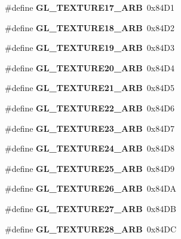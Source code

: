 \begin{DoxyCompactItemize}
\item 
\#define {\bfseries G\+L\+\_\+\+T\+E\+X\+T\+U\+R\+E17\+\_\+\+A\+R\+B}~0x84\+D1\label{_s_d_l__opengl_8h_a7ff96afdff3dd5d0020643dcfedddd0f}

\item 
\#define {\bfseries G\+L\+\_\+\+T\+E\+X\+T\+U\+R\+E18\+\_\+\+A\+R\+B}~0x84\+D2\label{_s_d_l__opengl_8h_a3009d9288b5ff6a7218a04efb42f94f0}

\item 
\#define {\bfseries G\+L\+\_\+\+T\+E\+X\+T\+U\+R\+E19\+\_\+\+A\+R\+B}~0x84\+D3\label{_s_d_l__opengl_8h_a6b2f54a8037012a8dc8e10146b29ba4c}

\item 
\#define {\bfseries G\+L\+\_\+\+T\+E\+X\+T\+U\+R\+E20\+\_\+\+A\+R\+B}~0x84\+D4\label{_s_d_l__opengl_8h_aa050e993492ce097cf0273be4838014f}

\item 
\#define {\bfseries G\+L\+\_\+\+T\+E\+X\+T\+U\+R\+E21\+\_\+\+A\+R\+B}~0x84\+D5\label{_s_d_l__opengl_8h_a8cd9b3a28066afd7694b4fc4c9629f80}

\item 
\#define {\bfseries G\+L\+\_\+\+T\+E\+X\+T\+U\+R\+E22\+\_\+\+A\+R\+B}~0x84\+D6\label{_s_d_l__opengl_8h_a57e5fe52a954449546b89da9f45fd415}

\item 
\#define {\bfseries G\+L\+\_\+\+T\+E\+X\+T\+U\+R\+E23\+\_\+\+A\+R\+B}~0x84\+D7\label{_s_d_l__opengl_8h_a2939ad95f95329f1864350f7f6f671ae}

\item 
\#define {\bfseries G\+L\+\_\+\+T\+E\+X\+T\+U\+R\+E24\+\_\+\+A\+R\+B}~0x84\+D8\label{_s_d_l__opengl_8h_a35a9bfe5b9159b6acf132c2443037b8e}

\item 
\#define {\bfseries G\+L\+\_\+\+T\+E\+X\+T\+U\+R\+E25\+\_\+\+A\+R\+B}~0x84\+D9\label{_s_d_l__opengl_8h_a3f2b8c9b9b107ace1cdef8f7982f99c0}

\item 
\#define {\bfseries G\+L\+\_\+\+T\+E\+X\+T\+U\+R\+E26\+\_\+\+A\+R\+B}~0x84\+D\+A\label{_s_d_l__opengl_8h_a4e7e2342e0ef23951d29ff5bb7a27559}

\item 
\#define {\bfseries G\+L\+\_\+\+T\+E\+X\+T\+U\+R\+E27\+\_\+\+A\+R\+B}~0x84\+D\+B\label{_s_d_l__opengl_8h_aea7c294abd4ba4cb46912fcd0f609b7e}

\item 
\#define {\bfseries G\+L\+\_\+\+T\+E\+X\+T\+U\+R\+E28\+\_\+\+A\+R\+B}~0x84\+D\+C\label{_s_d_l__opengl_8h_a6de7d27243b3d0fdd4a359928369e0e5}


\end{DoxyCompactItemize}
